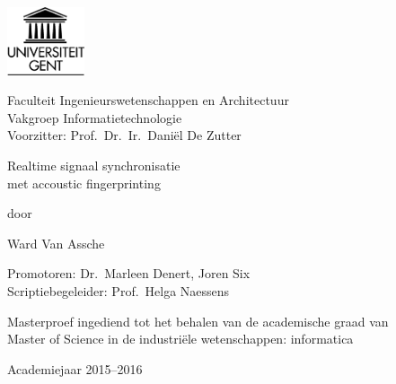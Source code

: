 

\begin{titlepage}

\setlength{\hoffset}{-1in}
\setlength{\voffset}{-1in}
\setlength{\topmargin}{1.5cm}
\setlength{\headheight}{0.5cm}
\setlength{\headsep}{1cm}
\setlength{\oddsidemargin}{3cm}
\setlength{\evensidemargin}{3cm}
\setlength{\footskip}{1.5cm}
\enlargethispage{1cm}

\fontsize{12pt}{14pt}
\selectfont

\begin{center}

\includegraphics[height=2cm]{fig/ruglogo}

\vspace{0.5cm}

Faculteit Ingenieurswetenschappen en Architectuur\\
Vakgroep Informatietechnologie\\
Voorzitter: Prof.~Dr.~Ir.~Dani\"{e}l De Zutter

\vspace{3.5cm}

\fontsize{17.28pt}{21pt}
\selectfont

Realtime signaal synchronisatie \\
met accoustic fingerprinting

\fontsize{12pt}{14pt}
\selectfont

\vspace{.6cm}

door 

\vspace{.4cm}

Ward Van Assche

\vspace{3.5cm}

Promotoren: Dr.~Marleen Denert, Joren Six\\
Scriptiebegeleider: Prof.~Helga Naessens\\

\vspace{2cm}

Masterproef ingediend tot het behalen van de academische graad van\\
Master of Science in de industri\"{e}le wetenschappen: informatica

\vspace{1cm}

Academiejaar 2015--2016

\end{center}
\end{titlepage}
